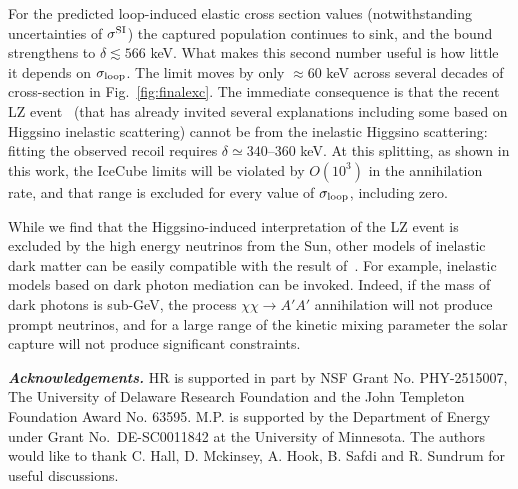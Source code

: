 \documentclass[prl,reprint,superscriptaddress]{revtex4-2}
\begin{document}
   For the predicted loop-induced elastic cross section values (notwithstanding uncertainties of $\sigma^{\rm SI}$) the captured population
continues to sink, and the bound strengthens to $\delta \lesssim 566$ keV. 
What
makes this second number useful is how little it depends on
$\sigma_{\rm loop}$. 
The limit moves by
only $\approx 60$ keV across several decades of cross-section in Fig.~\ref{fig:finalexc}. %
The
immediate consequence is that the recent LZ event~\cite{LZ:2026extended} (that  has already invited several explanations \cite{Su:2026LZ,Fan:2026LZ,Freese:2026LZ,Wu:2026LZ,Lou:2026LZ} including some based on Higgsino inelastic scattering) cannot be from the inelastic Higgsino
scattering: fitting the observed recoil requires $\delta \simeq 340$--$360$ keV. At this splitting, as shown in this work, the IceCube limits will be violated by $O(10^3)$ in the annihilation rate,
and that range is excluded for every value of $\sigma_{\rm loop}$, including zero.

While we find that the Higgsino-induced interpretation of the LZ event is excluded by the high energy neutrinos from the Sun, other models of inelastic dark matter can be easily compatible with the result of~\cite{LZ:2026extended}. For example, inelastic models based on dark photon mediation \cite{Arkani-Hamed:2008hhe,Batell:2009vb,Finkbeiner:2009mi} can be invoked. Indeed, if the mass of dark photons is sub-GeV, the process $\chi\chi\to A'A'$ annihilation will not produce prompt neutrinos, and for a large range of the kinetic mixing parameter the solar capture will not produce significant constraints. 

\textit{\textbf{Acknowledgements.}}
HR is supported in part by NSF
Grant No. PHY-2515007, The University
of Delaware Research Foundation and the John Templeton Foundation Award No. 63595. M.P. is supported by the Department of Energy under Grant No.~DE-SC0011842 at the University of Minnesota. The authors would like to thank C. Hall, D. Mckinsey, A. Hook, B. Safdi and R. Sundrum for useful discussions.







\end{document}
